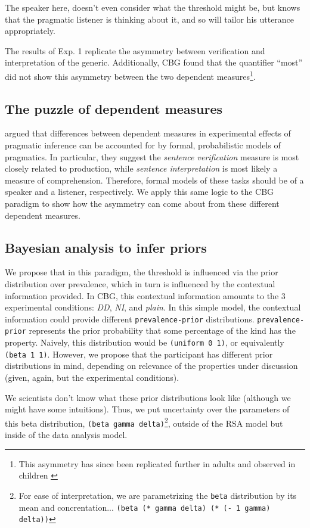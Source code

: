 \documentclass[10pt,letterpaper]{article}
\begin{document}
The speaker here, doesn't even consider what the threshold might be, but knows that the pragmatic listener is thinking about it, and so will tailor his utterance appropriately.

The results of Exp. 1 replicate the asymmetry between verification and interpretation of the generic. Additionally, CBG  found that the quantifier ``most'' did not show this asymmetry between the two dependent measures\footnote{This asymmetry has since been replicated further in adults and observed in children \cite{Brandone2014}}. 

\subsection{The puzzle of dependent measures}

 argued that differences between dependent measures in experimental effects of pragmatic inference can be accounted for by formal, probabilistic models of pragmatics. In particular, they suggest the \emph{sentence verification} measure is most closely related to production, while \emph{sentence interpretation} is most likely a measure of comprehension. Therefore, formal models of these tasks should be of a speaker and a listener, respectively. We apply this same logic to the CBG paradigm to show how the asymmetry can come about from these different dependent measures.


\subsection{Bayesian analysis to infer priors}

We propose that in this paradigm, the threshold is influenced via the prior distribution over prevalence, which in turn is influenced by the contextual information provided. In CBG, this contextual information amounts to the 3 experimental conditions: \emph{DD}, \emph{NI}, and \emph{plain}. In this simple model, the contextual information could provide different \lstinline{prevalence-prior} distributions. \lstinline{prevalence-prior} represents the  prior probability that some percentage of the kind has the property. Naively, this distribution would be \lstinline{(uniform 0 1)}, or equivalently \lstinline{(beta 1 1)}. However, we propose that the participant has different prior distributions in mind, depending on relevance of the properties under discussion (given, again, but the experimental conditions).

We scientists don't know what these prior distributions look like (although we might have some intuitions). Thus, we put uncertainty over the parameters of this beta distribution, \lstinline{(beta gamma delta)}\footnote{For ease of interpretation, we are parametrizing the \lstinline{beta} distribution by its mean and concrentation... \lstinline{(beta (* gamma delta) (* (- 1 gamma) delta))}}, outside of the RSA model but inside of the data analysis model. 
\end{document}
